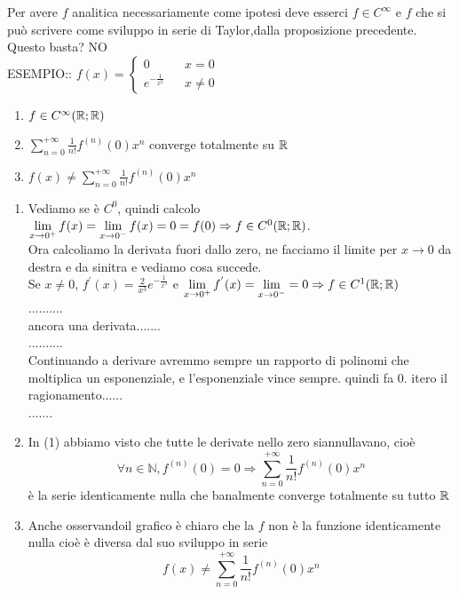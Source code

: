 Per avere $f$ analitica  necessariamente come ipotesi deve esserci $f\in C^{\infty}$ e $f$ che si può scrivere come sviluppo in serie di Taylor,dalla proposizione precedente. Questo basta? NO\\
ESEMPIO:: $f(x)=\left\{\begin{matrix}0&& x=0\\e^{-\frac{1}{x^2}}&&x\ne 0\end{matrix}\right.$\\
\begin{center}
	\begin{tikzpicture}[scale=1]
	\end{tikzpicture}
\end{center}
\begin{enumerate}
	\item $f\in C^{\infty}( \R; \R)$
	\item $\sum\limits_{n=0}^{+\infty}\frac{1}{n!}f^{(n)}(0)x^n$ converge totalmente su $ \R$
	\item $f(x)\ne\sum\limits_{n=0}^{+\infty}\frac{1}{n!}f^{(n)}(0)x^n$
\end{enumerate}
\begin{enumerate}
	\item Vediamo se è $C^0$, quindi calcolo $\lim\limits_{x\to 0^{+}}f(x)=\lim\limits_{x\to 0^{-}}f(x)=0=f(0)\Rightarrow f\in C^0( \R; \R)$.\\
	Ora calcoliamo la derivata fuori dallo zero, ne facciamo il limite per $x\to 0$ da destra e da sinitra e vediamo cosa succede.\\
	Se $x\ne 0$, $f^{'}(x)=\frac{2}{x^3}e^{-\frac{1}{x^3}}$ e $\lim\limits_{x\to 0^{+}}f^{'}(x)=\lim\limits_{x\to 0^{-}} = 0\Rightarrow f\in C^1( \R; \R)$\\
	..........\\
	ancora una derivata.......\\
	..........\\
	Continuando a derivare  avremmo sempre un rapporto di polinomi che moltiplica un esponenziale, e l'esponenziale vince sempre. quindi fa $0$.
	itero il ragionamento......\\
	.......\\
	\item In (1) abbiamo visto  che tutte le derivate nello zero siannullavano, cioè 
	$$\forall n\in\mathbb{N}, f^{(n)}(0)=0\Rightarrow \sum\limits_{n=0}^{+\infty}\frac{1}{n!}f^{(n)}(0)x^n$$
	è la serie identicamente nulla  che banalmente converge totalmente su tutto $ \R$
	\item Anche osservandoil grafico è chiaro che la $f$ non è la funzione identicamente nulla cioè è diversa dal suo sviluppo in serie
	$$f(x)\ne\sum\limits_{n=0}^{+\infty}\frac{1}{n!}f^{(n)}(0)x^n$$
\end{enumerate}

